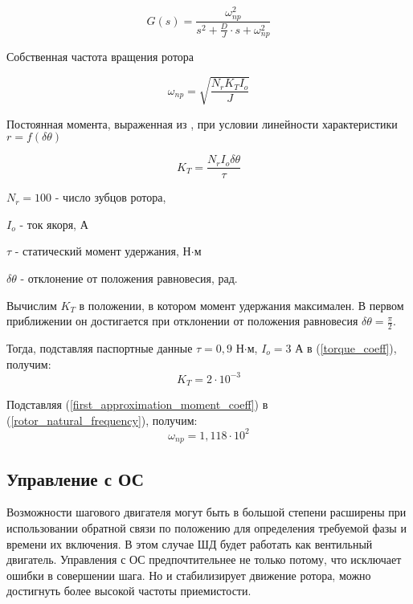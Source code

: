 \begin{equation}
    \label{step_motor_transfer_function}
    G(s) = \frac{ \omega_{np}^{2} }
                { s^{2} + \frac{D}{J} \cdot s + \omega_{np}^{2} }
\end{equation}

Собственная частота вращения ротора \cite[гл. 4.2, ф-ла 4.48]{Kenio}

\begin{equation}
    \label{rotor_natural_frequency}
    \omega_{np} = \sqrt{\frac{N_{r}K_{T}I_{o}}{J}}
\end{equation}

Постоянная момента, выраженная из \cite[гл. 4.2, ф-ла 4.52]{Kenio}, при условии линейности характеристики $r = f(\delta\theta)$

\begin{equation}
    \label{torque_coeff}
    K_{T} = \frac{N_{r}I_{o}\delta\theta}{\tau}
\end{equation}

$N_{r} = 100$ - число зубцов ротора,

$I_{o}$ - ток якоря, А

$\tau$ - статический момент удержания, Н$\cdot$м

$\delta\theta$ - отклонение от положения равновесия, рад.
\newline
\newline

Вычислим $K_{T}$ в положении, в котором момент удержания максимален.
В первом приближении он достигается при отклонении от положения равновесия
$\delta\theta = \frac{\pi}{2}$.

Тогда, подставляя паспортные данные $\tau = 0,9$ Н$\cdot$м, $I_{o} = 3$
А в (\ref{torque_coeff}), получим:
\begin{equation}
    \label{first_approximation_moment_coeff}
    K_{T} = 2\cdot10^{-3}
\end{equation}

Подставляя (\ref{first_approximation_moment_coeff}) в (\ref{rotor_natural_frequency}), получим:
\begin{equation}
    \label{first_approximation_rotor_natural_frequency}
    \omega_{np} = 1,118 \cdot 10^{2}
\end{equation}

\newpage
\subsection{ Управление с ОС }
Возможности шагового двигателя могут быть в большой степени расширены при использовании обратной
связи по положению для определения требуемой фазы и времени их включения. В этом случае ШД будет
работать как вентильный двигатель. Управления с ОС предпочтительнее не только потому, что исключает
ошибки в совершении шага. Но и стабилизирует движение ротора, можно достигнуть более высокой
частоты приемистости.

